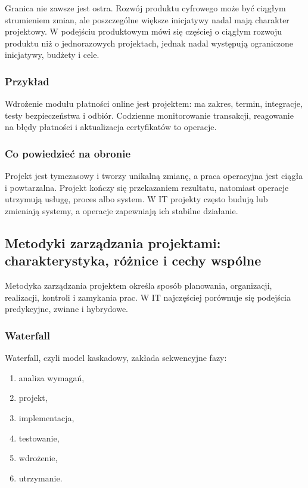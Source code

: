 Granica nie zawsze jest ostra. Rozwój produktu cyfrowego może być ciągłym strumieniem zmian, ale poszczególne większe inicjatywy nadal mają charakter projektowy. W podejściu produktowym mówi się częściej o ciągłym rozwoju produktu niż o jednorazowych projektach, jednak nadal występują ograniczone inicjatywy, budżety i cele.

\subsubsection{Przykład}

Wdrożenie modułu płatności online jest projektem: ma zakres, termin, integracje, testy bezpieczeństwa i odbiór. Codzienne monitorowanie transakcji, reagowanie na błędy płatności i aktualizacja certyfikatów to operacje.

\subsubsection{Co powiedzieć na obronie}

Projekt jest tymczasowy i tworzy unikalną zmianę, a praca operacyjna jest ciągła i powtarzalna. Projekt kończy się przekazaniem rezultatu, natomiast operacje utrzymują usługę, proces albo system. W IT projekty często budują lub zmieniają systemy, a operacje zapewniają ich stabilne działanie.

\subsection{Metodyki zarządzania projektami: charakterystyka, różnice i cechy wspólne}

Metodyka zarządzania projektem określa sposób planowania, organizacji, realizacji, kontroli i zamykania prac. W IT najczęściej porównuje się podejścia predykcyjne, zwinne i hybrydowe.

\subsubsection{Waterfall}

Waterfall, czyli model kaskadowy, zakłada sekwencyjne fazy:
\begin{enumerate}
  \item analiza wymagań,
  \item projekt,
  \item implementacja,
  \item testowanie,
  \item wdrożenie,
  \item utrzymanie.
\end{enumerate}

